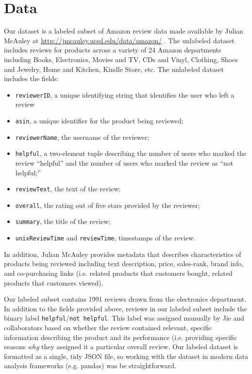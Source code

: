 \section{Data}

Our dataset is a labeled subset of Amazon review data made available by Julian McAuley at \url{http://jmcauley.ucsd.edu/data/amazon/} \cite{he2016ups, mcauley2015image}.
The unlabeled dataset includes reviews for products across a variety of 24 Amazon departments including Books, Electronics, Movies and TV, CDs and Vinyl, Clothing, Shoes and Jewelry, Home and Kitchen, Kindle Store, etc.
The unlabeled dataset includes the fields:
\begin{itemize}
\item \texttt{reviewerID}, a unique identifying string that identifies the user who left a review
\item \texttt{asin}, a unique identifier for the product being reviewed;
\item \texttt{reviewerName}, the username of the reviewer;
\item \texttt{helpful}, a two-element tuple describing the number of users who marked the review ``helpful'' and the number of users who marked the review as ``not helpful;''
\item \texttt{reviewText}, the text of the review;
\item \texttt{overall}, the rating out of five stars provided by the reviewer;
\item \texttt{summary}, the title of the review;
\item \texttt{unixReviewTime} and \texttt{reviewTime}, timestamps of the review.
\end{itemize}


In addition, Julian McAuley provides metadata that describes characteristics of products being reviewed including text description, price, sales-rank, brand info, and co-purchasing links (i.e. related products that customers bought, related products that customers viewed).

Our labeled subset contains 1991 reviews drawn from the electronics department.
In addition to the fields provided above, reviews in our labeled subset include the binary label \texttt{helpful}/\texttt{not helpful}.
This label was assigned manually by Jie and collaborators based on whether the review contained relevant, specific information describing the product and its performance (i.e. providing specific reasons \textit{why} they assigned it a particular overall review.
Our labeled dataset is formatted as a single, tidy JSON file, so working with the dataset in modern data analysis frameworks (e.g. pandas) was be straightforward.